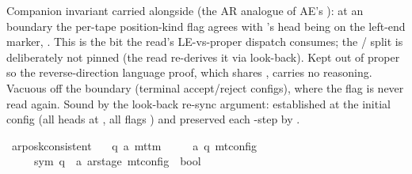 \begin{isabellebody}
\begin{isamarkuptext}%
Companion invariant carried alongside  (the AR
  analogue of AE's ): at an
   boundary the per-tape position-kind flag
   agrees with 's head being on the left-end
  marker, .  This is
  the bit the read's LE-vs-proper dispatch consumes; the
  / split is
  deliberately not pinned (the read re-derives it via look-back).  Kept
  out of  proper so the reverse-direction language
  proof, which shares , carries no 
  reasoning.  Vacuous off the  boundary (terminal
  accept/reject configs), where the flag is never read again.  Sound by
  the look-back re-sync argument: established
  at the initial config (all heads at , all flags
  ) and preserved each -step by
  .%
\end{isamarkuptext}\isamarkuptrue%
\isamarkupfalse%
\ ar{\isacharunderscore}{\kern0pt}posk{\isacharunderscore}{\kern0pt}consistent\ {\isacharcolon}{\kern0pt}{\isacharcolon}{\kern0pt}\isanewline
\ \ {\isachardoublequoteopen}{\isacharparenleft}{\kern0pt}{\isacharprime}{\kern0pt}q{\isacharcomma}{\kern0pt}\ {\isacharprime}{\kern0pt}a{\isacharparenright}{\kern0pt}\ mttm\isanewline
\ \ \ \ {\isasymRightarrow}\ {\isacharparenleft}{\kern0pt}{\isacharprime}{\kern0pt}a{\isacharcomma}{\kern0pt}\ {\isacharprime}{\kern0pt}q{\isacharparenright}{\kern0pt}\ mt{\isacharunderscore}{\kern0pt}config\isanewline
\ \ \ \ {\isasymRightarrow}\ {\isacharparenleft}{\kern0pt}sym{}{\isacharcomma}{\kern0pt}\ {\isacharprime}{\kern0pt}q\ {\isasymtimes}\ {\isacharprime}{\kern0pt}a\ ar{\isacharunderscore}{\kern0pt}stage{\isacharparenright}{\kern0pt}\ mt{\isacharunderscore}{\kern0pt}config\ {\isasymRightarrow}\ bool{\isachardoublequoteclose}\ \isanewline

\end{isabellebody}

